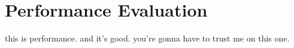 \section{Performance Evaluation}
this is performance. and it's good. you're gonna have to trust me on this one.